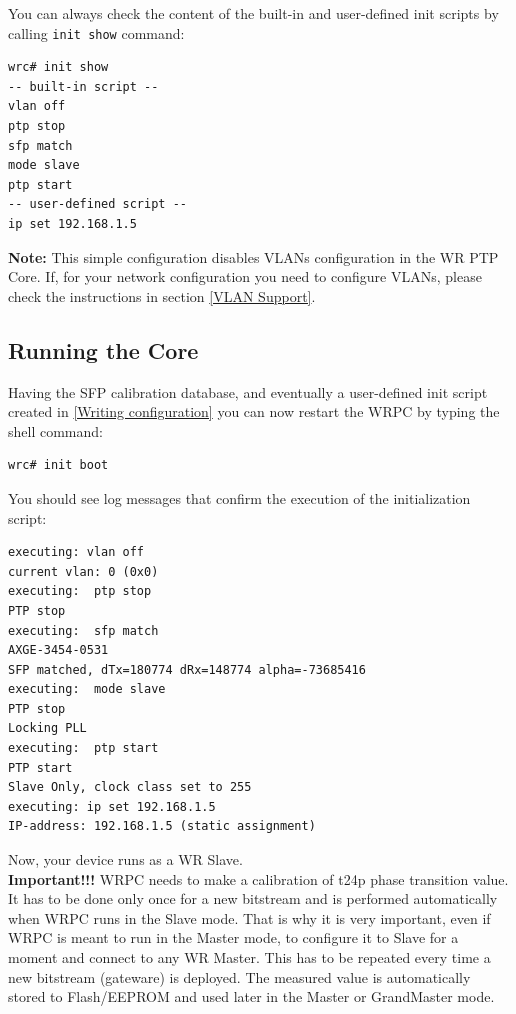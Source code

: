 \documentclass[a4paper, 12pt]{article}
\renewcommand{\_}{\underscore\allowbreak}
\begin{document}
You can always check the content of the built-in and user-defined init scripts
by calling \texttt{init show} command:
\begin{lstlisting}
wrc# init show
-- built-in script --
vlan off
ptp stop
sfp match
mode slave
ptp start
-- user-defined script --
ip set 192.168.1.5
\end{lstlisting}

\noindent\textbf{Note:} This simple configuration disables VLANs configuration
in the WR PTP Core. If, for your network configuration you need to configure
VLANs, please check the instructions in section \ref{VLAN Support}.

\subsection{Running the Core}
\label{Running the Core}

Having the SFP calibration database, and eventually a user-defined init script
created in \ref{Writing configuration} you can now restart the WRPC by typing
the shell command:

\begin{lstlisting}
wrc# init boot
\end{lstlisting}

You should see log messages that confirm the execution of the initialization
script:
\begin{minipage}{\textwidth}
\begin{lstlisting}
executing: vlan off
current vlan: 0 (0x0)
executing:  ptp stop
PTP stop
executing:  sfp match
AXGE-3454-0531  
SFP matched, dTx=180774 dRx=148774 alpha=-73685416
executing:  mode slave
PTP stop
Locking PLL
executing:  ptp start
PTP start
Slave Only, clock class set to 255
executing: ip set 192.168.1.5
IP-address: 192.168.1.5 (static assignment)
\end{lstlisting}
\end{minipage}

Now, your device runs as a WR Slave.\\

\textbf{Important!!!} WRPC needs to make a calibration of t24p phase transition
value. It has to be done only once for a new bitstream and is performed
automatically when WRPC runs in the Slave mode. That is why it is very
important, even if WRPC is meant to run in the Master mode, to configure it to
Slave for a moment and connect to any WR Master. This has to be repeated every
time a new bitstream (gateware) is deployed. The measured value is automatically
stored to Flash/EEPROM and used later in the Master or GrandMaster mode.\\
\end{document}

